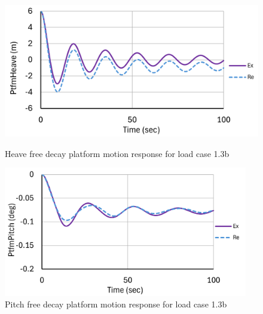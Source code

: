 \documentclass[a4paper, 11pt]{article}
\begin{document}
\begin{figure}[H]
    \begin{minipage}{0.47\textwidth}
        \centering
        \includegraphics[width=1\textwidth]{1.3b_heave_mine_1.png}
        \caption{\small Heave free decay platform motion response for load case 1.3b}
        \label{fig:1.3b_heave_mine_recreated}
    \end{minipage}
    \hfill
    \begin{minipage}{0.49\textwidth}
        \centering
        \includegraphics[width=0.95\textwidth]{1.3b_pitch_mine_1.png}
        \caption{\small Pitch free decay platform motion response for load case 1.3b}
        \label{fig:1.3b_pitch_mine_recreated}
    \end{minipage}
\end{figure}
\end{document}
